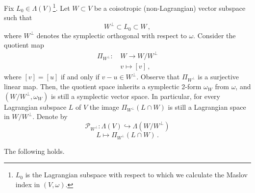 \documentclass[AHL, Unicode, longabstracts, published]{cedram}
\renewcommand*\P{\mathcal{P}}
\begin{document}
Fix $L_0\in\Lambda(V)$\footnote{$L_0$ is the Lagrangian subspace with respect to which we calculate the Maslov index in $(V,\omega)$.}. Let $W\subset V$ be a coisotropic (non-Lagrangian) vector subspace such that
\[
W^\perp\subset L_0\subset W\,,
\]
where $W^\perp$ denotes the symplectic orthogonal with respect to $\omega$. Consider the quotient map
\begin{equation*}
\begin{aligned}
\Pi_{W^\perp}:& \,W\to W/W^\perp\\
&\,v\mapsto [v]\,,
\end{aligned}
\end{equation*}
where $[v]=[u]$ if and only if $v-u\in W^\perp$. Observe that $\Pi_{W^\perp}$ is a surjective linear map. Then, the quotient space inherits a symplectic 2-form $\omega_W$ from $\omega$, and $(W/W^\perp,\omega_W)$ is still a symplectic vector space. In particular, for every Lagrangian subspace $L$ of $V$ the image $\Pi_{W^\perp}(L\cap W)$ is still a Lagrangian space in $W/W^\perp$. Denote by
\[
\P_{W^\perp}:\Lambda(V)\hookrightarrow \Lambda\left(W/W^\perp\right)
\]
\[
L\mapsto \Pi_{W^\perp}(L\cap W)\,.
\]



The following holds.
\end{document}
